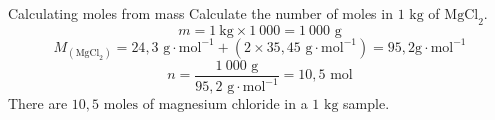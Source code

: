             \label{m38717*secfhsst!!!underscore!!!id641} 
      \begin{wex}{Calculating moles from mass }
{
Calculate the number of moles in $1\text{ kg}$ of $\text{MgCl}_{2}$.
     }
{
\label{m38717*id278854}\nopagebreak\noindent{}
    \begin{equation*}
    m = 1~\text{kg} \times 1 ~000=1 ~000\text{ g}
      \end{equation*}
\label{m38717*id278912}\nopagebreak\noindent{}
    \begin{equation*}
    {M}_{(\text{MgCl}_{2})} = 24,3 \text{ g} \cdot \text{mol}^{-1} + (2 \times 35,45 \text{ g} \cdot \text{mol}^{-1}) = 95,2 \text{g} \cdot \text{mol}^{-1}
      \end{equation*}    
      \label{m38717*id279005}\nopagebreak\noindent{}
    \begin{equation*}
    n=\frac{1~000 \text{ g}}{95,2 \text{ g} \cdot \text{mol}^{-1}} = 10,5 \text{ mol}
      \end{equation*}
      \label{m38717*id279046}There are $10,5 \text{ moles}$ of magnesium chloride in a $1 \text{ kg}$ sample.
}
    \end{wex}
\label{m38717*secfhsst!!!underscore!!!id832}
